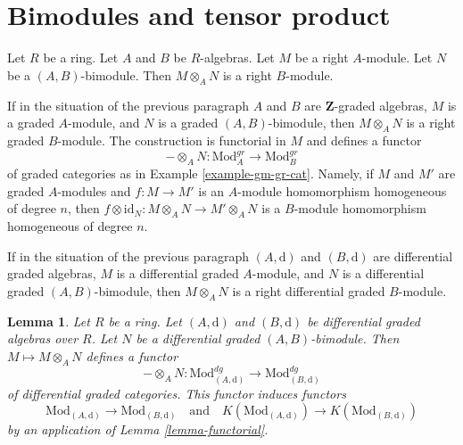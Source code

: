 \documentclass{stacks-project}
\theoremstyle{plain}
\newtheorem{lemma}[subsection]{Lemma}
\theoremstyle{definition}
\theoremstyle{remark}
\numberwithin{equation}{subsection}
\begin{document}
\section{Bimodules and tensor product}
\label{section-bimodules-tensor}

\noindent
Let $R$ be a ring. Let $A$ and $B$ be $R$-algebras. Let $M$ be a right
$A$-module. Let $N$ be a $(A, B)$-bimodule. Then
$M \otimes_A N$ is a right $B$-module.

\medskip\noindent
If in the situation of the previous paragraph
$A$ and $B$ are $\mathbf{Z}$-graded algebras,
$M$ is a graded $A$-module, and $N$ is a graded $(A, B)$-bimodule,
then $M \otimes_A N$ is a right graded $B$-module. The construction
is functorial in $M$ and defines a functor
$$
- \otimes_A N :
\text{Mod}^{gr}_A
\longrightarrow
\text{Mod}^{gr}_B
$$
of graded categories as in Example \ref{example-gm-gr-cat}. Namely, if
$M$ and $M'$ are graded $A$-modules and $f : M \to M'$ is an $A$-module
homomorphism homogeneous of degree $n$, then
$f \otimes \text{id}_N : M \otimes_A N \to M' \otimes_A N$
is a $B$-module homomorphism homogeneous of degree $n$.

\medskip\noindent
If in the situation of the previous paragraph
$(A, \text{d})$ and $(B, \text{d})$ are differential graded algebras,
$M$ is a differential graded $A$-module, and $N$ is a differential
graded $(A, B)$-bimodule, then $M \otimes_A N$ is a right
differential graded $B$-module.

\begin{lemma}
\label{lemma-tensor}
Let $R$ be a ring. Let $(A, \text{d})$ and $(B, \text{d})$
be differential graded algebras over $R$. Let $N$ be a
differential graded $(A, B)$-bimodule. Then
$M \mapsto M \otimes_A N$ defines a functor
$$
- \otimes_A N :
\text{Mod}^{dg}_{(A, \text{d})}
\longrightarrow
\text{Mod}^{dg}_{(B, \text{d})}
$$
of differential graded categories. This functor induces functors
$$
\text{Mod}_{(A, \text{d})} \to \text{Mod}_{(B, \text{d})}
\quad\text{and}\quad
K(\text{Mod}_{(A, \text{d})}) \to K(\text{Mod}_{(B, \text{d})})
$$
by an application of Lemma \ref{lemma-functorial}.
\end{lemma}
\end{document}
